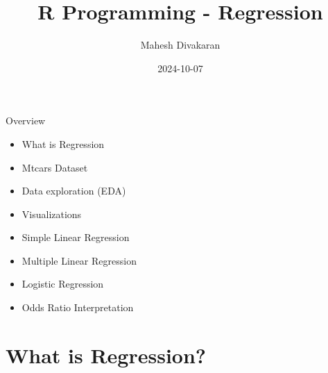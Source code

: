\documentclass[
  18 pt,
  ignorenonframetext,
  aspectratio=1610,
]{beamer}
\title{R Programming - Regression}
\author{Mahesh Divakaran}
\date{2024-10-07}
\institute{Amity University, Lucknow}
\providecommand{\tightlist}{%
  \setlength{\itemsep}{0pt}\setlength{\parskip}{0pt}}\usepackage{longtable,booktabs,array}
\begin{document}
\frame{\titlepage}
\ifdefined\Shaded\renewenvironment{Shaded}{\begin{tcolorbox}[boxrule=0pt, frame hidden, breakable, interior hidden, enhanced, borderline west={3pt}{0pt}{shadecolor}, sharp corners]}{\end{tcolorbox}}\fi

\begin{frame}{Overview}
\protect\hypertarget{overview}{}
\begin{itemize}
\tightlist
\item
  What is Regression
\item
  Mtcars Dataset
\item
  Data exploration (EDA)
\item
  Visualizations
\item
  Simple Linear Regression
\item
  Multiple Linear Regression
\item
  Logistic Regression
\item
  Odds Ratio Interpretation
\end{itemize}
\end{frame}

\hypertarget{what-is-regression}{%
\section{What is Regression?}\label{what-is-regression}}
\end{document}
